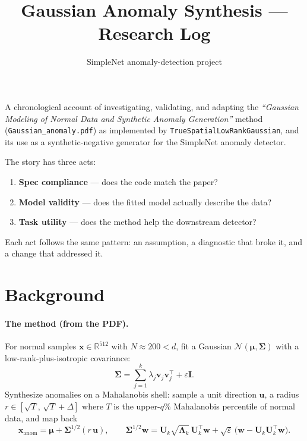 \documentclass[11pt]{article}
\title{Gaussian Anomaly Synthesis --- Research Log}
\author{SimpleNet anomaly-detection project}
\date{}
\newcommand{\code}[1]{\texttt{#1}}
\newcommand{\Uk}{\mathbf{U}_k}
\newcommand{\bmu}{\boldsymbol{\mu}}
\newcommand{\bSigma}{\boldsymbol{\Sigma}}
\newcommand{\bLambda}{\boldsymbol{\Lambda}}
\begin{document}
\maketitle

\noindent
A chronological account of investigating, validating, and adapting the
\emph{``Gaussian Modeling of Normal Data and Synthetic Anomaly Generation''}
method (\code{Gaussian\_anomaly.pdf}) as implemented by
\code{TrueSpatialLowRankGaussian}, and its use as a synthetic-negative generator
for the SimpleNet anomaly detector.

\medskip
\noindent
The story has three acts:
\begin{enumerate}[noitemsep]
  \item \textbf{Spec compliance} --- does the code match the paper?
  \item \textbf{Model validity} --- does the fitted model actually describe the data?
  \item \textbf{Task utility} --- does the method help the downstream detector?
\end{enumerate}
Each act follows the same pattern: an assumption, a diagnostic that broke it, and
a change that addressed it.

\tableofcontents

\section{Background}

\paragraph{The method (from the PDF).}
For normal samples $\mathbf{x} \in \mathbb{R}^{512}$ with $N \approx 200 < d$, fit
a Gaussian $\mathcal{N}(\bmu, \bSigma)$ with a low-rank-plus-isotropic covariance:
\begin{equation}
  \bSigma = \sum_{j=1}^{k} \lambda_j \mathbf{v}_j \mathbf{v}_j^\top + \varepsilon \mathbf{I}.
  \label{eq:sigma}
\end{equation}
Synthesize anomalies on a Mahalanobis shell: sample a unit direction $\mathbf{u}$,
a radius $r \in [\sqrt{T},\, \sqrt{T} + \Delta]$ where $T$ is the upper-$q\%$
Mahalanobis percentile of normal data, and map back
\begin{equation}
  \mathbf{x}_{\text{anom}} = \bmu + \bSigma^{1/2}(r\,\mathbf{u}),
  \qquad
  \bSigma^{1/2}\mathbf{w} = \Uk \sqrt{\bLambda_k}\, \Uk^\top \mathbf{w}
    + \sqrt{\varepsilon}\,\bigl(\mathbf{w} - \Uk \Uk^\top \mathbf{w}\bigr).
  \label{eq:sigmahalf}
\end{equation}
\end{document}

